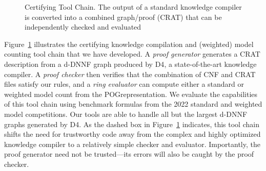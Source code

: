 \documentclass[letterpaper,USenglish,cleveref, autoref, thm-restate]{lipics-v2021}
\newcommand{\progname}[1]{\textsc{#1}}
\newcommand{\dfour}{\progname{D4}}
\begin{document}
\begin{figure}
\caption{Certifying Tool Chain.
  The output of a standard knowledge compiler is converted into a combined graph/proof (CRAT) that can be independently checked and evaluated}
\label{fig:chain}
\end{figure}


Figure~\ref{fig:chain} illustrates the certifying knowledge compilation
and (weighted) model counting tool chain that we have developed.  A
{\em proof generator} generates a CRAT description from a d-DNNF
graph produced by \dfour{}, a state-of-the-art knowledge compiler.
A {\em proof checker} then verifies that the combination of CNF and CRAT files
satisfy our rules, and a {\em ring evaluator} can compute
either a standard or weighted model count from the POG\@ representation.
We evaluate the capabilities of this tool chain using
benchmark formulas from the 2022 standard and weighted model
competitions.  Our tools are able to handle all but the largest d-DNNF
graphs generated by \dfour{}.
As the dashed box in Figure~\ref{fig:chain} indicates, this tool chain
shifts the need for trustworthy code away from the complex and highly
optimized knowledge compiler to a relatively simple checker and
evaluator.  Importantly, the proof generator need not be
trusted---its errors will also be caught by the proof checker.
\end{document}

